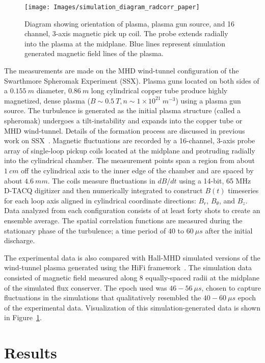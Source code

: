 \documentclass[aps,prl,amsmath,amssymb,reprint,superscriptaddress]{revtex4-1} %
\begin{document}
\begin{figure}[!htbp]
\centerline{
\texttt{[image: Images/simulation\_diagram\_radcorr\_paper]}}
\caption{\label{fig:chamber} Diagram showing orientation of plasma, plasma gun source, and 16 channel, 3-axis magnetic pick up coil. The probe extends radially into the plasma at the midplane. Blue lines represent simulation generated magnetic field lines of the plasma.}
\end{figure}

The measurements are made on the MHD wind-tunnel configuration of the Swarthmore Spheromak Experiment (SSX). Plasma guns located on both sides of a $0.155~m$ diameter, $0.86~m$ long cylindrical copper tube produce highly magnetized, dense plasma ($B \sim 0.5~T, n \sim 1\times 10^{21}~m^{-3}$) using a plasma gun source. The turbulence is generated as the initial plasma structure (called a spheromak) undergoes a tilt-instability and expands into the copper tube or MHD wind-tunnel. Details of the formation process are discussed in previous work on SSX~\cite{schaffner14a,schaffner14b,brown14,brown15a,brown15b}. Magnetic fluctuations are recorded by a 16-channel, 3-axis probe array of single-loop pickup coils located at the midplane and protruding radially into the cylindrical chamber. The measurement points span a region from about $1~cm$ off the cylindrical axis to the inner edge of the chamber and are spaced by about $4.6~mm$. The coils measure fluctuations in $dB/dt$ using a 14-bit, 65 MHz D-TACQ digitizer and then numerically integrated to construct $B(t)$ timeseries for each loop axis aligned in cylindrical coordinate directions: $B_{r}$, $B_{\theta}$, and $B_{z}$. Data analyzed from each configuration consists of at least forty shots to create an ensemble average. The spatial correlation functions are measured during the stationary phase of the turbulence; a time period of $40$ to $60~\mu s$ after the initial discharge. 

The experimental data is also compared with Hall-MHD simulated versions of the wind-tunnel plasma generated using the HiFi framework~\cite{schaffner14a}. The simulation data consisted of magnetic field measured along 8 equally-spaced radii at the midplane of the simulated flux conserver. The epoch used was $46-56~ \mu s$, chosen to capture fluctuations in the simulations that qualitatively resembled the $40-60\ \mu s$ epoch of the experimental data. Visualization of this simulation-generated data is shown in Figure~\ref{fig:chamber}.

\section{Results}
\end{document}
